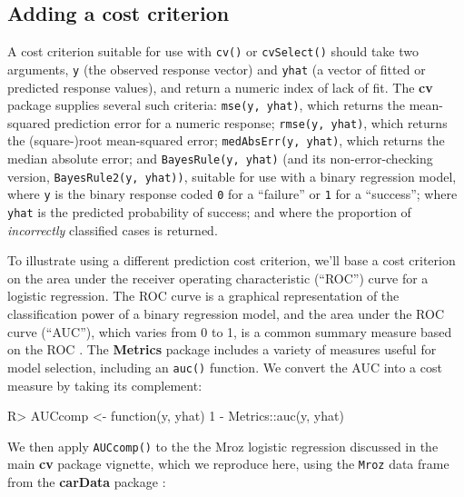 \documentclass[
]{jss}
\begin{document}
\hypertarget{adding-a-cost-criterion}{%
\subsection{Adding a cost criterion}\label{adding-a-cost-criterion}}

A cost criterion suitable for use with \texttt{cv()} or
\texttt{cvSelect()} should take two arguments, \texttt{y} (the observed
response vector) and \texttt{yhat} (a vector of fitted or predicted
response values), and return a numeric index of lack of fit. The
\textbf{cv} package supplies several such criteria:
\texttt{mse(y,\ yhat)}, which returns the mean-squared prediction error
for a numeric response; \texttt{rmse(y,\ yhat)}, which returns the
(square-)root mean-squared error; \texttt{medAbsErr(y,\ yhat)}, which
returns the median absolute error; and \texttt{BayesRule(y,\ yhat)} (and
its non-error-checking version, \texttt{BayesRule2(y,\ yhat))}, suitable
for use with a binary regression model, where \texttt{y} is the binary
response coded \texttt{0} for a ``failure'' or \texttt{1} for a
``success''; where \texttt{yhat} is the predicted probability of
success; and where the proportion of \emph{incorrectly} classified cases
is returned.

To illustrate using a different prediction cost criterion, we'll base a
cost criterion on the area under the receiver operating characteristic
(``ROC'') curve for a logistic regression. The ROC curve is a graphical
representation of the classification power of a binary regression model,
and the area under the ROC curve (``AUC''), which varies from 0 to 1, is
a common summary measure based on the ROC
\citep[see][]{Wikipedia-ROC:2023}. The \textbf{Metrics} package
\citep{HamnerFrasco:2018} includes a variety of measures useful for
model selection, including an \texttt{auc()} function. We convert the
AUC into a cost measure by taking its complement:

\begin{CodeChunk}
\begin{CodeInput}
R> AUCcomp <- function(y, yhat) 1 - Metrics::auc(y, yhat)
\end{CodeInput}
\end{CodeChunk}

We then apply \texttt{AUCcomp()} to the the Mroz logistic regression
discussed in the main \textbf{cv} package vignette, which we reproduce
here, using the \texttt{Mroz} data frame from the \textbf{carData}
package \citep{FoxWeisberg:2019}:
\end{document}
